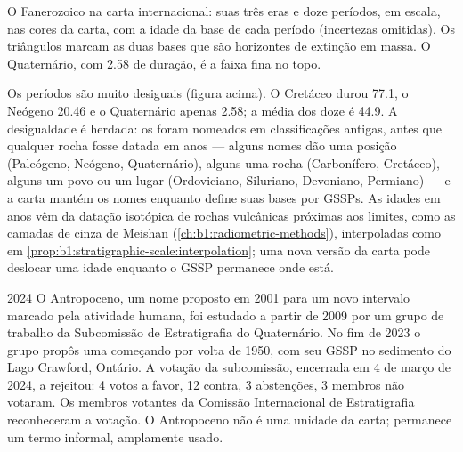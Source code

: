 \begin{omfigure}
{\small O Fanerozoico na carta internacional: suas três eras e doze períodos, em escala, nas
cores da carta, com a idade da base de cada período (incertezas omitidas). Os triângulos marcam
as duas bases que são horizontes de extinção em massa. O Quaternário, com \qty{2.58}{\Ma} de
duração, é a faixa fina no topo.}
\label{fig:b1:stratigraphic-scale:chart}
\end{omfigure}

Os períodos são muito desiguais (figura acima). O Cretáceo durou \qty{77.1}{\Myr}, o Neógeno
\qty{20.46}{\Myr} e o Quaternário apenas \qty{2.58}{\Myr}; a média dos doze é \qty{44.9}{\Myr}.
A desigualdade é herdada: os  foram nomeados em classificações antigas, antes que
qualquer rocha fosse datada em anos --- alguns nomes dão uma posição (Paleógeno, Neógeno,
Quaternário), alguns uma rocha (Carbonífero, Cretáceo), alguns um povo ou um lugar
(Ordoviciano, Siluriano, Devoniano, Permiano) --- e a carta mantém os nomes enquanto define
suas bases por GSSPs. As idades em anos vêm da datação isotópica de rochas vulcânicas
próximas aos limites, como as camadas de cinza de Meishan (\cref{ch:b1:radiometric-methods}),
interpoladas como em \cref{prop:b1:stratigraphic-scale:interpolation}; uma nova versão da carta
pode deslocar uma idade enquanto o GSSP permanece onde está.

\begin{dated}{2024}
O Antropoceno, um nome proposto em 2001 para um novo intervalo marcado pela atividade humana,
foi estudado a partir de 2009 por um grupo de trabalho da Subcomissão de Estratigrafia do
Quaternário. No fim de 2023 o grupo propôs uma  começando por volta de 1950, com seu GSSP
no sedimento do Lago Crawford, Ontário. A votação da subcomissão, encerrada em 4 de março de
2024, a rejeitou: 4 votos a favor, 12 contra, 3 abstenções, 3 membros não votaram. Os membros
votantes da Comissão Internacional de Estratigrafia reconheceram a votação. O Antropoceno não é
uma unidade da carta; permanece um termo informal, amplamente usado.
\end{dated}

